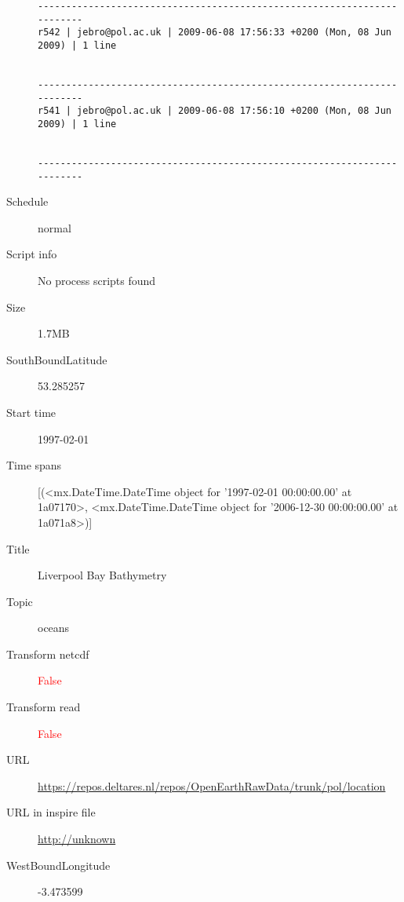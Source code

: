 \documentclass[9]{report}
\begin{document}
\begin{description}
\begin{verbatim}
------------------------------------------------------------------------
r542 | jebro@pol.ac.uk | 2009-06-08 17:56:33 +0200 (Mon, 08 Jun 2009) | 1 line


------------------------------------------------------------------------
r541 | jebro@pol.ac.uk | 2009-06-08 17:56:10 +0200 (Mon, 08 Jun 2009) | 1 line


------------------------------------------------------------------------

\end{verbatim}
  \item[Schedule] normal
  \item[Script info] No process scripts found
  \item[Size] 1.7MB
  \item[SouthBoundLatitude] 53.285257
  \item[Start time] 1997-02-01
  \item[Time spans] [(<mx.DateTime.DateTime object for '1997-02-01 00:00:00.00' at 1a07170>, <mx.DateTime.DateTime object for '2006-12-30 00:00:00.00' at 1a071a8>)]
  \item[Title]  Liverpool Bay Bathymetry 
  \item[Topic] oceans
  \item[Transform netcdf] \textcolor{red}{False}
  \item[Transform read] \textcolor{red}{False}
  \item[URL] \href{https://repos.deltares.nl/repos/OpenEarthRawData/trunk/pol/location}{https://repos.deltares.nl/repos/OpenEarthRawData/trunk/pol/location}
  \item[URL in inspire file] \href{http://unknown}{http://unknown}
  \item[WestBoundLongitude] -3.473599
\end{description}
\end{document}
